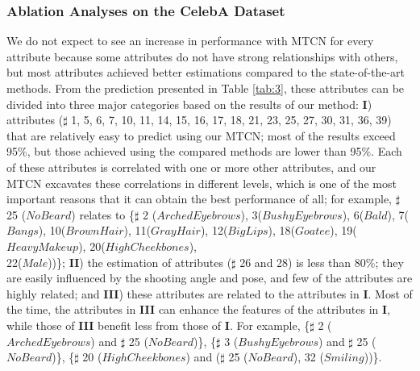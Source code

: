 \documentclass{sig-alternate-05-2015}
\begin{document}
\subsubsection{Ablation Analyses on the CelebA Dataset}
 We do not expect to see an increase in performance with MTCN for every attribute because some attributes do not have strong relationships with others, but most attributes achieved better estimations compared to the state-of-the-art methods. From the prediction presented in Table \ref{tab:3}, these attributes can be divided into three major categories based on the results of our method: \textbf{I}) attributes ($\sharp$ 1, 5, 6, 7, 10, 11, 14, 15, 16, 17, 18, 21, 23, 25, 27, 30, 31, 36, 39) that are relatively easy to predict using our MTCN; most of the results exceed 95\%, but those achieved using the compared methods are lower than 95\%. Each of these attributes is correlated with one or more other attributes, and our MTCN excavates these correlations in different levels, which is one of the most important reasons that it can obtain the best performance of all; for example, $\sharp$ 25 ($NoBeard$) relates to \{$\sharp$ 2 ($ArchedEyebrows$), 3($BushyEyebrows$), 6($Bald$), 7($Bangs$), 10($BrownHair$), 11($GrayHair$), 12($BigLips$), 18($Goatee$), 19($HeavyMakeup$), 20($HighCheekbones$), \\
 22($Male$))\}; \textbf{II}) the estimation of attributes ($\sharp$ 26 and 28) is less than 80\%; they are easily influenced by the shooting angle and pose, and few of the attributes are highly related; and \textbf{III}) these attributes are related to the attributes in \textbf{I}. Most of the time, the attributes in \textbf{III} can enhance the features of the attributes in \textbf{I}, while those of \textbf{III} benefit less from those of \textbf{I}. For example, \{$\sharp$ 2 ($ArchedEyebrows$) and $\sharp$ 25 ($NoBeard$)\}, \{$\sharp$ 3 ($BushyEyebrows$) and $\sharp$ 25 ($NoBeard$)\}, \{$\sharp$ 20 ($HighCheekbones$) and ($\sharp$ 25 ($NoBeard$), 32 ($Smiling$))\}.
\end{document}
